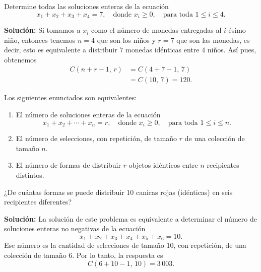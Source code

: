\begin{myexample}
    Determine todas las soluciones enteras de la ecuación
    $$x_1 + x_2 + x_3 + x_4 = 7, \quad \text{donde } x_i \geq 0, \quad \text{para toda } 1 \leq i \leq 4.$$

    \tcblower
    \textbf{\color{jblueleft}Solución:} Si tomamos a $x_i$ como el número de monedas entregadas al $i$-ésimo niño, entonces tenemos $n = 4$ que son los niños y $r = 7$ que son las monedas, es decir, esto es equivalente a distribuir $7$ monedas idénticas entre $4$ niños. Así pues, obtenemos
    \begin{align*}
        C(n + r - 1, \, r) & = C(4 + 7 - 1, \, 7) \\
        & = C(10, \, 7) = 120.
    \end{align*}
\end{myexample}

\begin{BOX}
    Los siguientes enunciados son equivalentes:
    \begin{enumerate}[label=\alph*)]
        \item El número de soluciones enteras de la ecuación
        $$x_1 + x_2 + \cdots + x_n = r, \quad \text{donde } x_i \geq 0, \quad \text{para toda } 1 \leq i \leq n.$$
        \item El número  de selecciones, con repetición, de tamaño $r$ de una colección de tamaño $n$.
        \item El número de formas de distribuir $r$ objetos idénticos entre $n$ recipientes distintos.
    \end{enumerate}
\end{BOX}

\newpage

\begin{myexample}
    ¿De cuántas formas se puede distribuir 10 canicas rojas (idénticas) en seis recipientes diferentes?

    \tcblower
    \textbf{\color{jblueleft}Solución:} La solución de este problema es equivalente a determinar el número de soluciones enteras no negativas de la ecuación
    $$x_1 + x_2 + x_3 + x_4 + x_5 + x_6 = 10.$$
    Ese número es la cantidad de selecciones de tamaño 10, con repetición, de una colección de tamaño 6. Por lo tanto, la respuesta es
    $$C(6 + 10 - 1, \, 10) = 3 \, 003.$$
\end{myexample}

